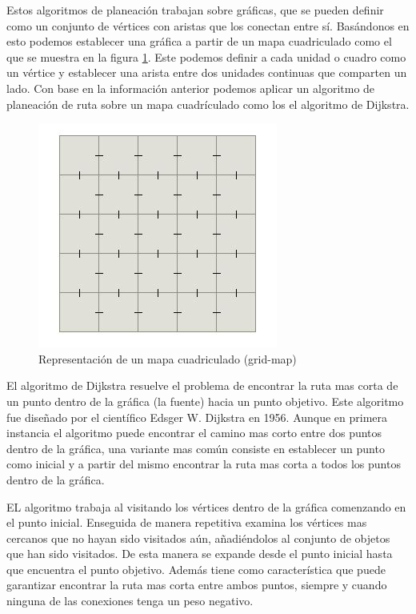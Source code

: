 \documentclass[10pt]{article}
\begin{document}
Estos algoritmos de planeación trabajan sobre gráficas, que se pueden definir como un conjunto de vértices con aristas que los conectan entre sí. Basándonos en esto podemos establecer una gráfica a partir de un mapa cuadriculado como el que se muestra en la figura \ref{fig:gridmap}. Este podemos definir a cada unidad o cuadro como un vértice y establecer una arista entre dos unidades continuas que comparten un lado. Con base en la información anterior podemos aplicar un algoritmo de planeación de ruta sobre un mapa cuadrículado como los el algoritmo de Dijkstra.

\begin{figure}[!]
	\centering
	\includegraphics[scale=0.5]{images/gridMap.JPG}
 	\caption{Representación de un mapa cuadriculado (grid-map)}
	\label{fig:gridmap}
\end{figure}

El algoritmo de Dijkstra resuelve el problema de encontrar la ruta mas corta de un punto dentro de la gráfica (la fuente) hacia un punto objetivo. Este algoritmo fue diseñado por el científico Edsger W. Dijkstra en 1956. Aunque en primera instancia el algoritmo puede encontrar el camino mas corto entre dos puntos dentro de la gráfica, una variante mas común consiste en establecer un punto como inicial y a partir del mismo encontrar la ruta mas corta a todos los puntos dentro de la gráfica.

EL algoritmo trabaja al visitando los vértices dentro de la gráfica comenzando en el punto inicial. Enseguida de manera repetitiva examina los vértices mas cercanos que no hayan sido visitados aún, añadiéndolos al conjunto de objetos que han sido visitados. De esta manera se expande desde el punto inicial hasta que encuentra el punto objetivo. Además tiene como característica que puede garantizar encontrar la ruta mas corta entre ambos puntos, siempre y cuando ninguna de las conexiones tenga un peso negativo.
\end{document}
